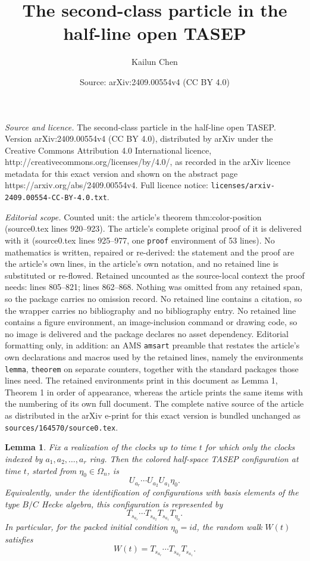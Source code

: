 \documentclass[10pt,a4paper]{amsart}
\title{The second-class particle in the half-line open TASEP}
\author{Kailun Chen}
\date{Source: arXiv:2409.00554v4 (CC BY 4.0)}
\newtheorem{lemma}{Lemma}
\begin{document}
\maketitle

\noindent\emph{Source and licence.} The second-class particle in the half-line open TASEP. Version arXiv:2409.00554v4 (CC BY 4.0), distributed by arXiv under the Creative Commons Attribution 4.0 International licence, http://creativecommons.org/licenses/by/4.0/, as recorded in the arXiv licence metadata for this exact version and shown on the abstract page https://arxiv.org/abs/2409.00554v4. Full licence notice: \texttt{licenses/arxiv-2409.00554-CC-BY-4.0.txt}.\par\smallskip

\noindent\textit{Editorial scope.} Counted unit: the article's theorem thm:color-position (source0.tex lines 920--923). The article's complete original proof of it is delivered with it (source0.tex lines 925--977, one \texttt{proof} environment of 53 lines). No mathematics is written, repaired or re-derived: the statement and the proof are the article's own lines, in the article's own notation, and no retained line is substituted or re-flowed.  Retained uncounted as the source-local context the proof needs: lines 805--821; lines 862--868.  Nothing was omitted from any retained span, so the package carries no omission record.  No retained line contains a citation, so the wrapper carries no bibliography and no bibliography entry.  No retained line contains a figure environment, an image-inclusion command or drawing code, so no image is delivered and the package declares no asset dependency.  Editorial formatting only, in addition: an AMS \texttt{amsart} preamble that restates the article's own declarations and macros used by the retained lines, namely the environments \texttt{lemma}, \texttt{theorem} on separate counters, together with the standard packages those lines need.  The retained environments print in this document as Lemma 1, Theorem 1 in order of appearance, whereas the article prints the same items with the numbering of its own full document.  The complete native source of the article as distributed in the arXiv e-print for this exact version is bundled unchanged as \texttt{sources/164570/source0.tex}.
\begin{lemma}
\label{lem:clock-sequence-hecke-product}
Fix a realization of the clocks up to time $t$ for which only the clocks indexed by
$a_1,a_2,\ldots,a_r$ ring. 
Then the colored half-space TASEP configuration at time $t$, started from $\eta_0\in\Omega_n$, is
\[
U_{a_r}\cdots U_{a_2}U_{a_1}\eta_0.
\]
Equivalently, under the identification of configurations with basis elements of the type $B/C$ Hecke algebra, this configuration is represented by
\[
T_{s_{a_r}}\cdots T_{s_{a_2}}T_{s_{a_1}}T_{\eta_0}.
\]
In particular, for the packed initial condition $\eta_0=id$, the random walk $W(t)$ satisfies
\[
W(t)=T_{s_{a_r}}\cdots T_{s_{a_2}}T_{s_{a_1}}.
\]
\end{lemma}
\end{document}
